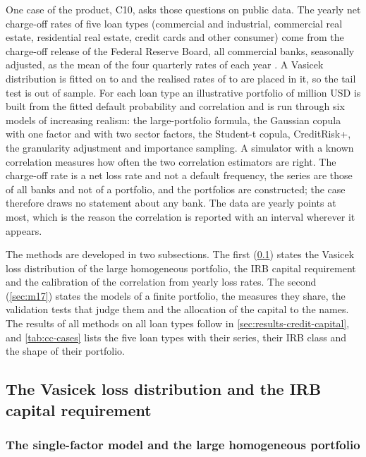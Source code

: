 One case of the product, C10, asks those questions on public data. The yearly net charge-off rates of five loan types (commercial and
industrial, commercial real estate, residential real estate, credit cards and other consumer) come from the charge-off release of the
Federal Reserve Board, all commercial banks, seasonally adjusted, as the mean of the four quarterly rates of each year
\citep{credit-capital:fed-chargeoff}. A Vasicek distribution is fitted on \ccFitFirst{} to \ccFitLast{} and the realised rates of
\ccEvFirst{} to \ccEvLast{} are placed in it, so the tail test is out of sample. For each loan type an illustrative portfolio of
\ccTotalEad{} million USD is built from the fitted default probability and correlation and is run through six models of increasing
realism: the large-portfolio formula, the Gaussian copula with one factor and with two sector factors, the Student-t copula,
CreditRisk+, the granularity adjustment and importance sampling. A simulator with a known correlation measures how often the two
correlation estimators are right. The charge-off rate is a net loss rate and not a default frequency, the series are those of all banks
and not of a portfolio, and the portfolios are constructed; the case therefore draws no statement about any bank. The data are
\ccFitYears{} yearly points at most, which is the reason the correlation is reported with an interval wherever it appears.

The methods are developed in two subsections. The first (\cref{sec:m16}) states the Vasicek loss distribution of the large homogeneous
portfolio, the IRB capital requirement and the calibration of the correlation from yearly loss rates. The second (\cref{sec:m17})
states the models of a finite portfolio, the measures they share, the validation tests that judge them and the allocation of the
capital to the names. The results of all methods on all loan types follow in \cref{sec:results-credit-capital}, and
\cref{tab:cc-cases} lists the five loan types with their series, their IRB class and the shape of their portfolio.



\subsection{The Vasicek loss distribution and the IRB capital requirement}
\label{sec:m16}

\subsubsection{The single-factor model and the large homogeneous portfolio}


